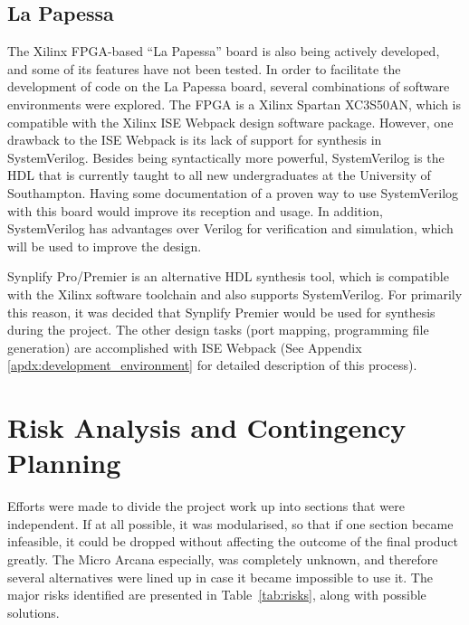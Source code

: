 	\subsection{La Papessa} %
	\label{sub:la_papessa_env}
		The Xilinx FPGA-based ``La Papessa'' board is also being actively developed, and some of its features have not been tested.  In order to facilitate the development of code on the La Papessa board, several combinations of software environments were explored.  The FPGA is a Xilinx Spartan XC3S50AN, which is compatible with the Xilinx ISE Webpack design software package.  However, one drawback to the ISE Webpack is its lack of support for synthesis in SystemVerilog. Besides being syntactically more powerful, SystemVerilog is the HDL that is currently taught to all new undergraduates at the University of Southampton. Having some documentation of a proven way to use SystemVerilog with this board would improve its reception and usage. In addition, SystemVerilog has advantages over Verilog for verification and simulation, which will be used to improve the design.

		Synplify Pro/Premier is an alternative HDL synthesis tool, which is compatible with the Xilinx software toolchain and also supports SystemVerilog. For primarily this reason, it was decided that Synplify Premier would be used for synthesis during the project.  The other design tasks (port mapping, programming file generation) are accomplished with ISE Webpack (See Appendix \ref{apdx:development_environment} for detailed description of this process).



\section{Risk Analysis and Contingency Planning} %
\label{sec:contingency_planning}
	Efforts were made to divide the project work up into sections that were independent.  If at all possible, it was modularised, so that if one section became infeasible, it could be dropped without affecting the outcome of the final product greatly.  The Micro Arcana especially, was completely unknown, and therefore several alternatives were lined up in case it became impossible to use it.  The major risks identified are presented in Table~\ref{tab:risks}, along with possible solutions.

